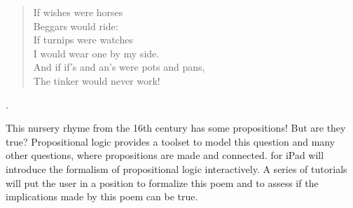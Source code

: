 


\begin{minipage}[t]{180mm}
\begin{verse}
If wishes were horses \\
Beggars would ride: \\
If turnips were watches \\
I would wear one by my side. \\
And if if's and an's were pots and pans, \\
The tinker would never work!
\end{verse}.
\end{minipage}

This nursery rhyme from the 16th century has some propositions! But are they true? 
Propositional logic provides a toolset to model this question and many other questions,
where propositions are made and connected. 
\Nyaya for iPad
will introduce the formalism of propositional logic interactively.
A series of tutorials will put the user in a position
to formalize this poem
and to assess if the implications made by this poem can be true.

